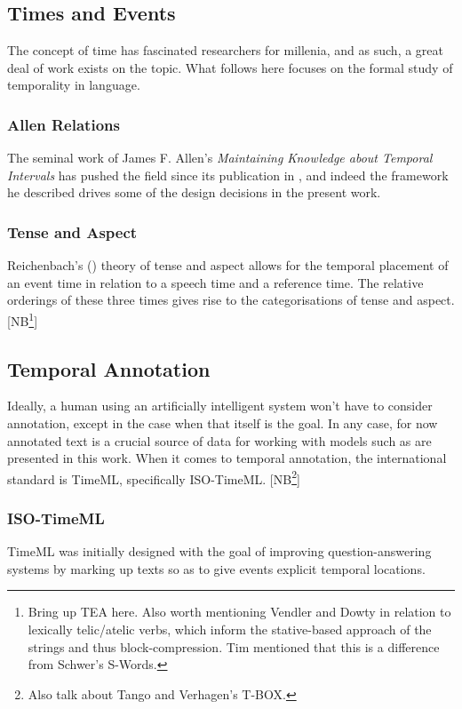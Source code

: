 \documentclass[a4paper,12pt,leqno]{article}
\newcommand{\selfnote}[1]{{\color{red}[NB\footnote{{\color{red}#1}}]}}
\begin{document}
\subsection{Times and Events}\label{sub:timesevents}
The concept of time has fascinated researchers for millenia, and as such, a great deal of work exists on the topic. What follows here focuses on the formal study of temporality in language.
\subsubsection{Allen Relations}\label{ssub:allen}
The seminal work of James F. Allen's \textit{Maintaining Knowledge about Temporal Intervals} has pushed the field since its publication in  \citeyear{allen1983maintaining}, and indeed the framework he described drives some of the design decisions in the present work.
\subsubsection{Tense and Aspect}\label{ssub:tenseaspect}
Reichenbach's (\citeyear{reichenbach1947elements}) theory of tense and aspect allows for the temporal placement of an event time in relation to a speech time and a reference time. The relative orderings of these three times gives rise to the categorisations of tense and aspect. \selfnote{Bring up TEA here. Also worth mentioning Vendler and Dowty in relation to lexically telic/atelic verbs, which inform the stative-based approach of the strings and thus block-compression. Tim mentioned that this is a difference from Schwer's S-Words.}
\subsection{Temporal Annotation}\label{sub:annotation}
Ideally, a human using an artificially intelligent system won't have to consider annotation, except in the case when that itself is the goal. In any case, for now annotated text is a crucial source of data for working with models such as are presented in this work. When it comes to temporal annotation, the international standard is TimeML, specifically ISO-TimeML. \selfnote{Also talk about Tango and Verhagen's T-BOX.}
\subsubsection{ISO-TimeML}\label{ssub:timeml}
TimeML \citep{Pustejovsky2005} was initially designed with the goal of improving question-answering systems by marking up texts so as to give events explicit temporal locations.
\end{document}
